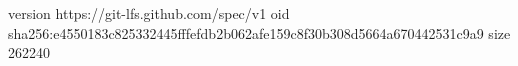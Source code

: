 version https://git-lfs.github.com/spec/v1
oid sha256:e4550183c825332445fffefdb2b062afe159c8f30b308d5664a670442531c9a9
size 262240
